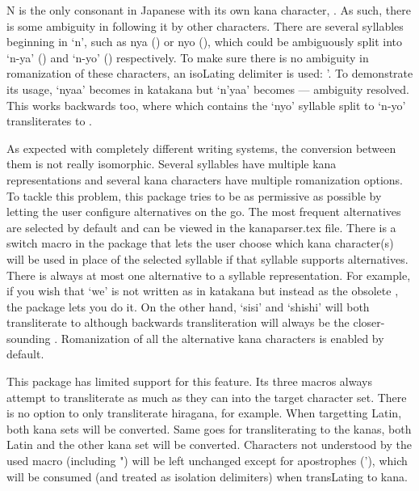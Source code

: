 \break{}

N is the only consonant in Japanese with its own kana character, .
As such, there is some ambiguity in following it by other characters.
There are several syllables beginning in `n', such as nya () or nyo (), which could be ambiguously split into `n-ya' () and `n-yo' () respectively.
To make sure there is no ambiguity in romanization of these characters, an isoLating delimiter is used: '. To demonstrate its usage, `nyaa' becomes  in katakana but `n'yaa' becomes  --- ambiguity resolved.
This works backwards too, where  which contains the `nyo' syllable split to `n-yo' transliterates to .


As expected with completely different writing systems, the conversion between them is not really isomorphic. Several syllables have multiple kana representations and several kana characters have multiple romanization options.
To tackle this problem, this package tries to be as permissive as possible by letting the user configure alternatives on the go.
The most frequent alternatives are selected by default and can be viewed in the kanaparser.tex file. There is a switch macro in the package that lets the user choose which kana character(s) will be used in place of the selected syllable if that syllable supports alternatives. There is always at most one alternative to a syllable representation.
For example, if you wish that `we' is not written as  in katakana but instead as the obsolete , the package lets you do it.
On the other hand, `sisi' and `shishi' will both transliterate to  although backwards transliteration will always be the closer-sounding .
Romanization of all the alternative kana characters is enabled by default.


This package has limited support for this feature. Its three macros always attempt to transliterate as much as they can into the target character set. There is no option to only transliterate hiragana, for example. When targetting Latin, both kana sets will be converted. Same goes for transliterating to the kanas, both Latin and the other kana set will be converted.
Characters not understood by the used macro (including ") will be left unchanged except for apostrophes ('), which will be consumed (and treated as isolation delimiters) when transLating to kana.

